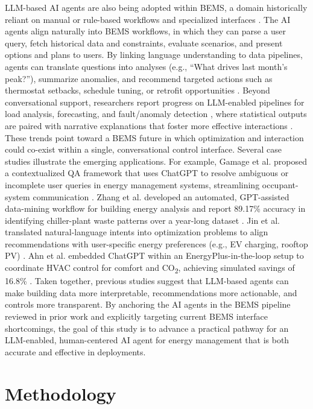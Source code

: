 \documentclass[final,3p,times]{elsarticle}
\begin{document}
LLM-based AI agents are also being adopted within BEMS, a domain historically reliant on manual or rule-based workflows and specialized interfaces \cite{zheng2023bim}. The AI agents align naturally into BEMS workflows, in which they can parse a user query, fetch historical data and constraints, evaluate scenarios, and present options and plans to users. By linking language understanding to data pipelines, agents can translate questions into analyses (e.g., “What drives last month’s peak?”), summarize anomalies, and recommend targeted actions such as thermostat setbacks, schedule tuning, or retrofit opportunities \cite{saka2023gpt}. Beyond conversational support, researchers report progress on LLM-enabled pipelines for load analysis, forecasting, and fault/anomaly detection \cite{jiang2024eplus,gu2025toward}, where statistical outputs are paired with narrative explanations that foster more effective interactions \cite{zhang2024automated}. These trends point toward a BEMS future in which optimization and interaction could co-exist within a single, conversational control interface. Several case studies illustrate the emerging applications. For example, Gamage et al. proposed a contextualized QA framework that uses ChatGPT to resolve ambiguous or incomplete user queries in energy management systems, streamlining occupant-system communication \cite{gamage2023augmenting}. Zhang et al. developed an automated, GPT-assisted data-mining workflow for building energy analysis and report 89.17\% accuracy in identifying chiller-plant waste patterns over a year-long dataset \cite{zhang2024automated}. Jin et al. translated natural-language intents into optimization problems to align recommendations with user-specific energy preferences (e.g., EV charging, rooftop PV) \cite{jin2023human}. Ahn et al. embedded ChatGPT within an EnergyPlus-in-the-loop setup to coordinate HVAC control for comfort and CO\textsubscript{2}, achieving simulated savings of 16.8\% \cite{ahn2023alternative}. Taken together, previous studies suggest that LLM-based agents can make building data more interpretable, recommendations more actionable, and controls more transparent. By anchoring the AI agents in the BEMS pipeline reviewed in prior work and explicitly targeting current BEMS interface shortcomings, the goal of this study is to advance a practical pathway for an LLM-enabled, human-centered AI agent for energy management that is both accurate and effective in deployments.

\section{Methodology}
\label{sec:framework}
\end{document}

